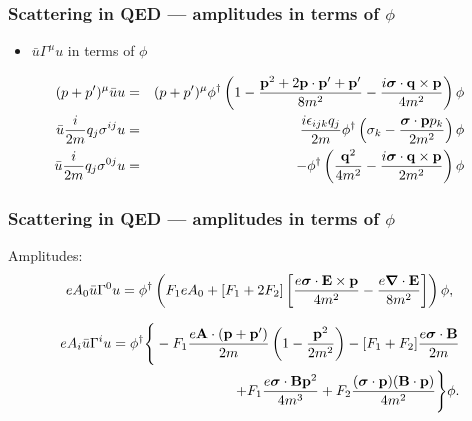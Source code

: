 \documentclass[11ppt]{beamer}
\newcommand{\sr}{u}
\newcommand{\srb}{\bar{u}}
\newcommand{\wx}{\phi}
\newcommand{\wxd}{\phi^\dagger}
\newcommand{\beqa}{\begin{eqnarray*} }
\newcommand{\eeqa}{\end{eqnarray*} }
\newcommand{\beq}{\begin{equation*} }
\newcommand{\eeq}{\end{equation*} }
\begin{document}
\begin{frame}
\frametitle{Scattering in QED --- amplitudes in terms of $\phi$}

\begin{itemize}
  \item $\bar{u} \Gamma^\mu u$ in terms of $\phi$
\end{itemize}
\footnotesize
\beqa 
	(p + p')^\mu \bar{u} u  &=& (p + p')^\mu \phi^\dagger \left( 
		1 -  \frac{ \v{p}^2  +2 \v{p} \cdot \v{p'} +  \v{p'}}{8m^2} - \frac{i\gv{\sigma} \cdot \v{q} \times \v{p} }{4m^2} 
		\right ) \phi \\
	\srb  \frac{i}{2m} q_j \sigma^{ij} \sr 
		&=& \frac{i \epsilon_{ijk} q_j}{2m} \wxd \left (
			\sigma_k - \frac{ \gv{\sigma} \cdot \v{p} p_k  }{2m^2} 
		\right ) \wx	\\
 \srb  \frac{i}{2m} q_j \sigma^{0j} \sr
	&=&  -  \wxd \left (
			\frac{  \v{q}^2  }{4m^2} 
			- \frac{  i\gv{\sigma} \cdot \v{q} \times \v{p}   }{2m^2} 
	\right ) \wx
\eeqa
\normalsize

\end{frame}
\begin{frame}
\frametitle{Scattering in QED --- amplitudes in terms of $\phi$}
Amplitudes:
\footnotesize
\beq
		 eA_0 \srb  \Gamma^0 \sr = \wxd \left(  
			F_1  eA_0
			+ [F_1 + 2 F_2] \left [ 
				\frac{e \gv{\sigma} \cdot \v{E} \times \v{p} }{4m^2}  - \frac{e  \grad \cdot \v{E} }{8m^2}
			\right ]
		\right ) \wx,
\eeq

\beq \begin{split}
	e A_i \srb \Gamma^i \sr =  \wxd \Bigg \{
		- F_1 \frac{ e\v{A} \cdot (\v{p} + \v{p'} ) }{2m} \left( 1 - \frac{\v{p}^2}{2m^2} \right )
		- [F_1 + F_2] \frac{ e \gv{\sigma} \cdot \v{B} }{2m} 
	\\	+ F_1 \frac{ e \gv{\sigma} \cdot \v{B} \v{p}^2 }{4m^3} 
		+ F_2 \frac{ (\gv{\sigma} \cdot \v{p}) (\v{B} \cdot \v{p}) }{4m^2}
	\Bigg \} \wx.
\end{split}
\eeq
\normalsize
\end{frame}
\end{document}
